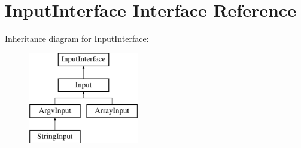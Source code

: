 \hypertarget{interface_symfony_1_1_components_1_1_console_1_1_input_1_1_input_interface}{
\section{InputInterface Interface Reference}
\label{interface_symfony_1_1_components_1_1_console_1_1_input_1_1_input_interface}
}
Inheritance diagram for InputInterface:\begin{figure}[H]
\begin{center}
\leavevmode
\includegraphics[height=4.000000cm]{interface_symfony_1_1_components_1_1_console_1_1_input_1_1_input_interface}
\end{center}
\end{figure}
